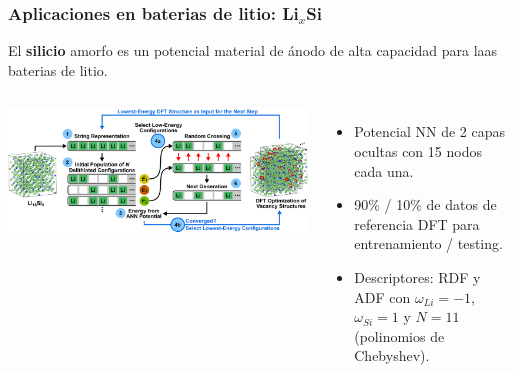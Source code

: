 \documentclass[aspectratio=169]{beamer}
\let\oldtextbf\textbf
\renewcommand{\textbf}[1]{\textcolor{nordblue}{\oldtextbf{#1}}}
\begin{document}
    \begin{frame}
        \frametitle{Aplicaciones en baterias de litio: Li$_x$Si}
        
        El \textbf{silicio} amorfo es un potencial material de ánodo de alta
        capacidad para laas baterias de litio.
        
        \begin{columns}
            \begin{center}
                \includegraphics[width=\columnwidth]{LiSi-metodo.png}
            \end{center}

            \pause
            
            \begin{itemize}
                \item Potencial NN de 2 capas ocultas con 15 nodos cada una.
                \item 90\% / 10\% de datos de referencia DFT para entrenamiento / 
                    testing.
                \item Descriptores: RDF y ADF con $\omega_{Li} = -1$, 
                    $\omega_{Si} = 1$ y $N = 11$ (polinomios de Chebyshev).
            \end{itemize}
        \end{columns}
            
    \end{frame}
    
\end{document}
